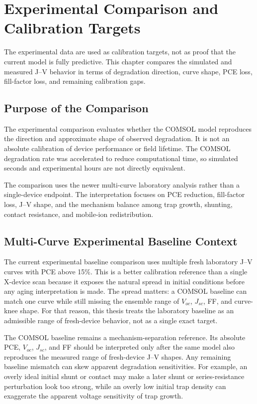 \chapter{Experimental Comparison and Calibration Targets}

The experimental data are used as calibration targets, not as proof that the
current model is fully predictive. This chapter compares the simulated and
measured J--V behavior in terms of degradation direction, curve shape, PCE
loss, fill-factor loss, and remaining calibration gaps.

\section{Purpose of the Comparison}

The experimental comparison evaluates whether the COMSOL model reproduces the
direction and approximate shape of observed degradation. It is not an absolute
calibration of device performance or field lifetime. The COMSOL degradation
rate was accelerated to reduce computational time, so simulated seconds and
experimental hours are not directly equivalent.

The comparison uses the newer multi-curve laboratory analysis rather than a
single-device endpoint. The interpretation focuses on PCE reduction,
fill-factor loss, J--V shape, and the mechanism balance among trap growth,
shunting, contact resistance, and mobile-ion redistribution.

\section{Multi-Curve Experimental Baseline Context}

The current experimental baseline comparison uses multiple fresh laboratory
J--V curves with PCE above 15\%. This is a better calibration reference than a
single X-device scan because it exposes the natural spread in initial
conditions before any aging interpretation is made. The spread matters: a
COMSOL baseline can match one curve while still missing the ensemble range of
$V_{oc}$, $J_{sc}$, FF, and curve-knee shape. For that reason, this thesis
treats the laboratory baseline as an admissible range of fresh-device
behavior, not as a single exact target.

The COMSOL baseline remains a mechanism-separation reference. Its absolute
PCE, $V_{oc}$, $J_{sc}$, and FF should be interpreted only after the same
model also reproduces the measured range of fresh-device J--V shapes. Any
remaining baseline mismatch can skew apparent degradation sensitivities. For
example, an overly ideal initial shunt or contact may make a later shunt or
series-resistance perturbation look too strong, while an overly low initial
trap density can exaggerate the apparent voltage sensitivity of trap growth.

